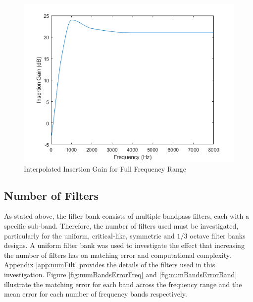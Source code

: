 \documentclass[12pt, onecolumn]{article}
\begin{document}
\begin{figure}[h]
\centering
\includegraphics[width=0.6\linewidth]{igFreqRange.PNG}
\caption{Interpolated Insertion Gain for Full Frequency Range}
\label{fig:igFreqRange}
\end{figure}  

\subsection{Number of Filters} 
\label{sec:numFreqBands}

\noindent As stated above, the filter bank consists of multiple bandpass filters, each with a specific sub-band. Therefore, the number of filters used must be investigated, particularly for the uniform, critical-like, symmetric and $1/3$ octave filter banks designs. A uniform filter bank was used to investigate the effect that increasing the number of filters has on matching error and computational complexity. Appendix \ref{app:numFilt} provides the details of the filters used in this investigation. Figure \ref{fig:numBandsErrorFreq} and \ref{fig:numBandsErrorBand} illustrate the matching error for each band across the frequency range and the mean error for each number of frequency bands respectively.
\end{document}
